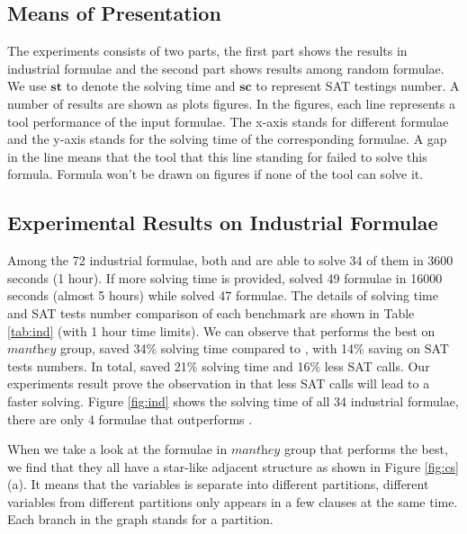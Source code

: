 \subsection{Means of Presentation}
The experiments consists of two parts, the first part shows the results in industrial formulae and the second part shows results among random formulae.
We use $\textbf{st}$ to denote the solving time and $\textbf{sc}$ to represent SAT testings number.
A number of results are shown as plots figures. In the figures, each line represents a tool performance of the input formulae. The x-axis stands for different formulae and the y-axis stands for the solving time of the corresponding formulae. A gap in the line means that the tool that this line standing for failed to solve this formula. Formula won't be drawn on figures if none of the tool can solve it.

\subsection{Experimental Results on Industrial Formulae}\label{sec:ind_expr}
Among the 72 industrial formulae, both \tool and \minibones are able to solve 34 of them in 3600 seconds (1 hour).
If more solving time is provided, \tool solved 49 formulae in 16000 seconds (almost 5 hours) while \minibones solved 47 formulae.
The details of solving time and SAT tests number comparison of each benchmark are shown in Table \ref{tab:ind} (with 1 hour time limits). We can observe that \tool performs the best on $\textit{manthey}$ group, saved 34\% solving time compared to \minibones, with 14\% saving on SAT tests numbers. In total, \tool saved 21\% solving time and 16\% less SAT calls. Our experiments result prove the observation in \cite{JLM15} that less SAT calls will lead to a faster solving.
Figure \ref{fig:ind} shows the solving time of all 34 industrial formulae, there are only 4 formulae that \minibones outperforms \tool.

When we take a look at the formulae in $\textit{manthey}$ group that \tool performs the best, we find that they all have a star-like adjacent structure as shown in Figure \ref{fig:cs} (a). It means that the variables is separate into different partitions, different variables from different partitions only appears in a few clauses at the same time. Each branch in the graph stands for a partition.



